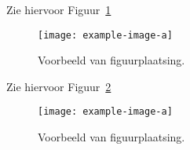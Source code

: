 \documentclass{article}
\begin{document}
    \lipsum[1-1]

    Zie hiervoor Figuur~\ref{fig:exampleFigurePlacement}

    \begin{figure}[h]
        \centering
        \texttt{[image: example-image-a]}
        \caption{Voorbeeld van figuurplaatsing.}
        \label{fig:exampleFigurePlacement}
    \end{figure}

    \lipsum[5-5]

    \newpage

    \lipsum[1-1]

    Zie hiervoor Figuur~\ref{fig:exampleFigurePlacement2}

    \begin{figure}[t]
        \centering
        \texttt{[image: example-image-a]}
        \caption{Voorbeeld van figuurplaatsing.}
        \label{fig:exampleFigurePlacement2}
    \end{figure}

    \lipsum[5-5]
\end{document}

